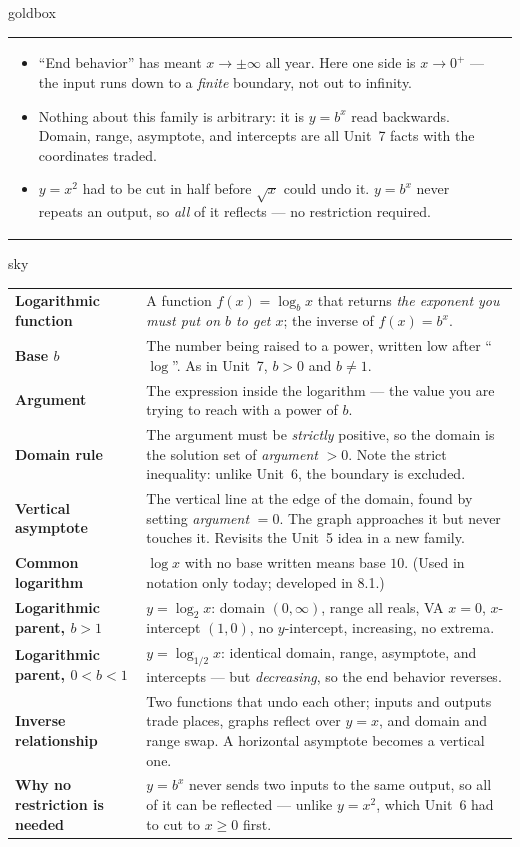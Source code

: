 \documentclass[10pt]{article}
\begin{document}
\begin{skillbox}{goldbox}
\begin{tabularx}{\linewidth}{@{}X|X@{}}
\begin{itemize}[leftmargin=1.1em, nosep, after=\vspace{2pt}]
  \item ``End behavior'' has meant $x\to\pm\infty$ all year. Here one side is $x\to 0^{+}$ --- the input runs down to a \emph{finite} boundary, not out to infinity.
  \item Nothing about this family is arbitrary: it is $y=b^x$ read backwards. Domain, range, asymptote, and intercepts are all Unit~7 facts with the coordinates traded.
  \item $y=x^2$ had to be cut in half before $\sqrt{x}$ could undo it. $y=b^x$ never repeats an output, so \emph{all} of it reflects --- no restriction required.
\end{itemize}
\end{tabularx}
\end{skillbox}

\begin{skillbox}{sky}
\renewcommand{\arraystretch}{1.3}
\begin{tabularx}{\linewidth}{@{}l X@{}}
\textbf{Logarithmic function} & A function $f(x)=\log_b x$ that returns \emph{the exponent you must put on $b$ to get $x$}; the inverse of $f(x)=b^x$. \\
\textbf{Base $b$} & The number being raised to a power, written low after ``$\log$''. As in Unit~7, $b>0$ and $b\ne1$. \\
\textbf{Argument} & The expression inside the logarithm --- the value you are trying to reach with a power of $b$. \\
\textbf{Domain rule} & The argument must be \emph{strictly} positive, so the domain is the solution set of \emph{argument} $>0$. Note the strict inequality: unlike Unit~6, the boundary is excluded. \\
\textbf{Vertical asymptote} & The vertical line at the edge of the domain, found by setting \emph{argument} $=0$. The graph approaches it but never touches it. Revisits the Unit~5 idea in a new family. \\
\textbf{Common logarithm} & $\log x$ with no base written means base $10$. (Used in notation only today; developed in 8.1.) \\
\textbf{Logarithmic parent, $b>1$} & $y=\log_2 x$: domain $(0,\infty)$, range all reals, VA $x=0$, $x$-intercept $(1,0)$, no $y$-intercept, increasing, no extrema. \\
\textbf{Logarithmic parent, $0<b<1$} & $y=\log_{1/2} x$: identical domain, range, asymptote, and intercepts --- but \emph{decreasing}, so the end behavior reverses. \\
\textbf{Inverse relationship} & Two functions that undo each other; inputs and outputs trade places, graphs reflect over $y=x$, and domain and range swap. A horizontal asymptote becomes a vertical one. \\
\textbf{Why no restriction is needed} & $y=b^x$ never sends two inputs to the same output, so all of it can be reflected --- unlike $y=x^2$, which Unit~6 had to cut to $x\ge0$ first. \\
\end{tabularx}
\end{skillbox}
\end{document}
